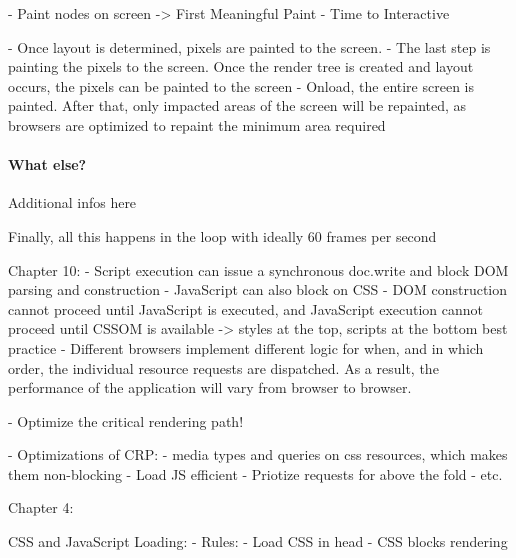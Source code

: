 - Paint nodes on screen
-> First Meaningful Paint
- Time to Interactive


- Once layout is determined, pixels are painted to the screen.
- The last step is painting the pixels to the screen. Once the render tree is created and layout occurs, the pixels can be painted to the screen
- Onload, the entire screen is painted. After that, only impacted areas of the screen will be repainted, as browsers are optimized to repaint the minimum area required




\paragraph{What else?}

Additional infos here


Finally, all this happens in the loop with ideally 60 frames per second







Chapter 10:
- Script execution can issue a synchronous doc.write and block DOM parsing and construction
- JavaScript can also block on CSS
- DOM construction cannot proceed until JavaScript is executed, and JavaScript execution cannot proceed until CSSOM is available
-> styles at the top, scripts at the bottom best practice
- Different browsers implement different logic for when, and in which order, the individual resource requests are dispatched. As a result, the performance of the application will vary from browser to browser.


- Optimize the critical rendering path!


- Optimizations of CRP:
- media types and queries on css resources, which makes them non-blocking
- Load JS efficient
- Priotize requests for above the fold
- etc. %

Chapter 4:

CSS and JavaScript Loading:
- Rules:
- Load CSS in head
- CSS blocks rendering

